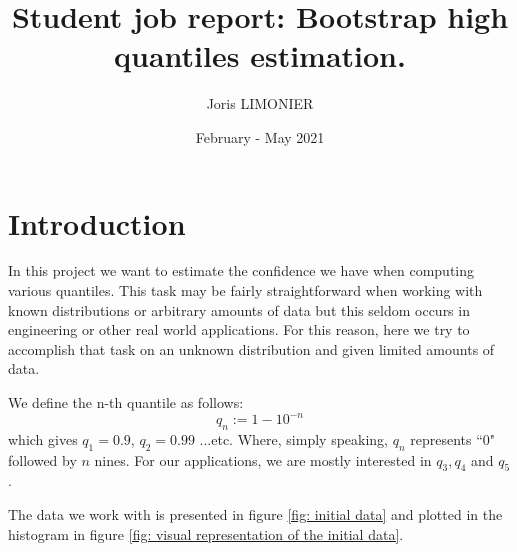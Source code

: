 \documentclass{article}
\title{Student job report: Bootstrap high quantiles estimation.}
\author{Joris LIMONIER}
\date{February - May 2021}
\begin{document}
\maketitle

\newpage
\tableofcontents
\listoffigures
\newpage

\section{Introduction}
In this project we want to estimate the confidence we have when computing various quantiles. This task may be fairly straightforward when working with known distributions or arbitrary amounts of data but this seldom occurs in engineering or other real world applications. For this reason, here we try to accomplish that task on an unknown distribution and given limited amounts of data.

We define the n-th quantile as follows:
\begin{equation}
    q_n := 1 - 10^{-n}
\end{equation}
which gives $q_1 = 0.9$, $q_2 = 0.99$ ...etc. Where, simply speaking, $q_n$ represents ``0" followed by $n$ nines. For our applications, we are mostly interested in $q_3, q_4$ and $q_5$.

The data we work with is presented in figure \ref{fig: initial data} and plotted in the histogram in figure \ref{fig: visual representation of the initial data}.
\end{document}
